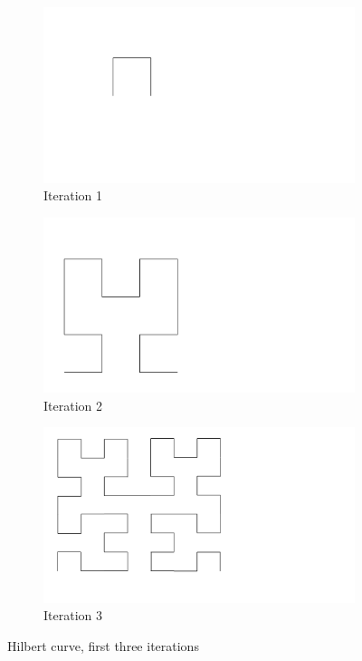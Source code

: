 \begin{figure}[ht]
     \centering
     \begin{subfigure}{0.2\textwidth}
         \centering
         \includegraphics[width=\textwidth]{figures/spaceFilling_h_1.pdf}
         \caption{Iteration 1}
     \end{subfigure}
     \hfill
      \begin{subfigure}{0.2\textwidth}
     \centering
     \includegraphics[width=\textwidth]{figures/spaceFilling_h_2.pdf}
     \caption{Iteration 2}
     \end{subfigure}
    \hfill
     \begin{subfigure}{0.2\textwidth}
         \centering
         \includegraphics[width=\textwidth]{figures/spaceFilling_h_3.pdf}
         \caption{Iteration 3}
     \end{subfigure}
        \caption{Hilbert curve, first three iterations}
        \label{fig:hilbertcurve}
\end{figure}

